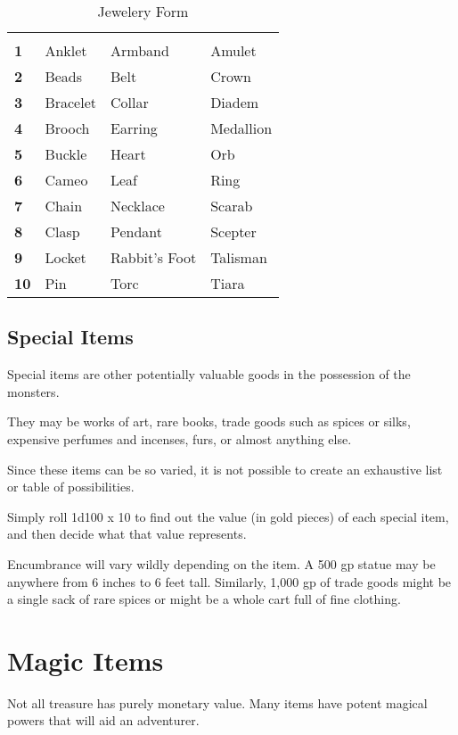 \begin{multicols*}{2}
\begin {table}[H]
  \caption{Jewelery Form}\label{tab:Jewelery Form}
  \begin{tabularx}{\columnwidth}{>{\bfseries}YYYY}
	 &  &  & \\
	1 & Anklet & Armband & Amulet\\
	2 & Beads & Belt & Crown\\
	3 & Bracelet & Collar & Diadem\\
	4 & Brooch & Earring & Medallion\\
	5 & Buckle & Heart & Orb\\
	6 & Cameo & Leaf & Ring\\
	7 & Chain & Necklace & Scarab\\
	8 & Clasp & Pendant & Scepter\\
	9 & Locket & Rabbit’s Foot & Talisman\\
	10 & Pin & Torc & Tiara
  \end {tabularx}
\end {table}

\subsection{Special Items}
Special items are other potentially valuable goods in the possession of the monsters.

They may be works of art, rare books, trade goods such as spices or silks, expensive perfumes and incenses, furs, or almost anything else.

Since these items can be so varied, it is not possible to create an exhaustive list or table of possibilities.

Simply roll 1d100 x 10 to find out the value (in gold pieces) of each special item, and then decide what that value represents.

Encumbrance will vary wildly depending on the item. A 500 gp statue may be anywhere from 6 inches to 6 feet tall. Similarly, 1,000 gp of trade goods might be a single sack of rare spices or might be a whole cart full of fine clothing.

\section{Magic Items}\label{sec:Magic Items}
Not all treasure has purely monetary value. Many items have potent magical powers that will aid an adventurer.


\end{multicols*}

